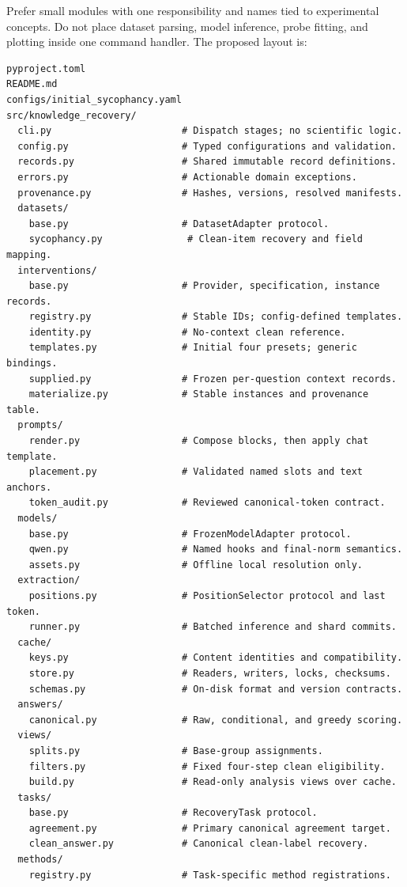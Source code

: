 \documentclass[11pt]{article}
\begin{document}
Prefer small modules with one responsibility and names tied to experimental concepts.
Do not place dataset parsing, model inference, probe fitting, and plotting inside one command handler.
The proposed layout is:
\begin{verbatim}
pyproject.toml
README.md
configs/initial_sycophancy.yaml
src/knowledge_recovery/
  cli.py                       # Dispatch stages; no scientific logic.
  config.py                    # Typed configurations and validation.
  records.py                   # Shared immutable record definitions.
  errors.py                    # Actionable domain exceptions.
  provenance.py                # Hashes, versions, resolved manifests.
  datasets/
    base.py                    # DatasetAdapter protocol.
    sycophancy.py               # Clean-item recovery and field mapping.
  interventions/
    base.py                    # Provider, specification, instance records.
    registry.py                # Stable IDs; config-defined templates.
    identity.py                # No-context clean reference.
    templates.py               # Initial four presets; generic bindings.
    supplied.py                # Frozen per-question context records.
    materialize.py             # Stable instances and provenance table.
  prompts/
    render.py                  # Compose blocks, then apply chat template.
    placement.py               # Validated named slots and text anchors.
    token_audit.py             # Reviewed canonical-token contract.
  models/
    base.py                    # FrozenModelAdapter protocol.
    qwen.py                    # Named hooks and final-norm semantics.
    assets.py                  # Offline local resolution only.
  extraction/
    positions.py               # PositionSelector protocol and last token.
    runner.py                  # Batched inference and shard commits.
  cache/
    keys.py                    # Content identities and compatibility.
    store.py                   # Readers, writers, locks, checksums.
    schemas.py                 # On-disk format and version contracts.
  answers/
    canonical.py               # Raw, conditional, and greedy scoring.
  views/
    splits.py                  # Base-group assignments.
    filters.py                 # Fixed four-step clean eligibility.
    build.py                   # Read-only analysis views over cache.
  tasks/
    base.py                    # RecoveryTask protocol.
    agreement.py               # Primary canonical agreement target.
    clean_answer.py            # Canonical clean-label recovery.
  methods/
    registry.py                # Task-specific method registrations.

\end{verbatim}
\end{document}
